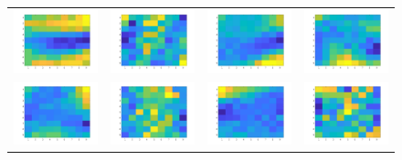 \documentclass{article} %
\begin{document}
\begin{figure}[H]
\centering
\begin{tabular}{cccc}
\includegraphics[width=0.2\linewidth]{images/Fig_weights_1.png}
&
\includegraphics[width=0.2\linewidth]{images/Fig_weights_2.png}
&
\includegraphics[width=0.2\linewidth]{images/Fig_weights_3.png}
&
\includegraphics[width=0.2\linewidth]{images/Fig_weights_4.png}
\\
\includegraphics[width=0.2\linewidth]{images/Fig_weights_5.png}
&
\includegraphics[width=0.2\linewidth]{images/Fig_weights_6.png}
&
\includegraphics[width=0.2\linewidth]{images/Fig_weights_7.png}
&
\includegraphics[width=0.2\linewidth]{images/Fig_weights_8.png}

\end{tabular}
\end{figure}
\end{document}

